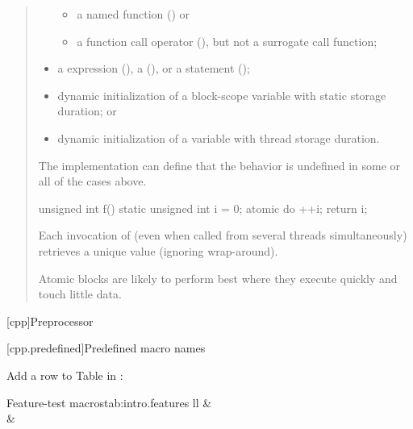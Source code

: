 \begin{quote}
\begin{itemize}
  \begin{itemize}
  \item
    a named function () or
  \item
    a function call operator (),
    but not a surrogate call function;
  \end{itemize}
\item
  a  expression (), a
   (), or a
   statement ();
\item
  dynamic initialization of a block-scope variable with static storage
  duration; or
\item
  dynamic initialization of a variable with thread storage duration.
\end{itemize}

\begin{note}
The implementation can define that the behavior is
undefined in some or all of the cases above.
\end{note}

\begin{example}
\begin{codeblock}
unsigned int f()
{
  static unsigned int i = 0;
  atomic do {
    ++i;
    return i;
  }
}
\end{codeblock}

Each invocation of 
(even when called from several threads simultaneously)
retrieves a unique value (ignoring wrap-around).
\end{example}

\begin{note}
Atomic blocks are likely to perform best where they execute
quickly and touch little data.
\end{note}
\end{quote}

\setcounter{chapter}{14}

[cpp]{Preprocessor}

\setcounter{section}{10}

[cpp.predefined]{Predefined macro names}

Add a row to Table  in :

\setcounter{table}{18}

\begin{floattable}{Feature-test macros}{tab:intro.features}
{ll}
\topline
{} &  \\
\capsep
{}  & \tcode{\tsver} \\
\end{floattable}


